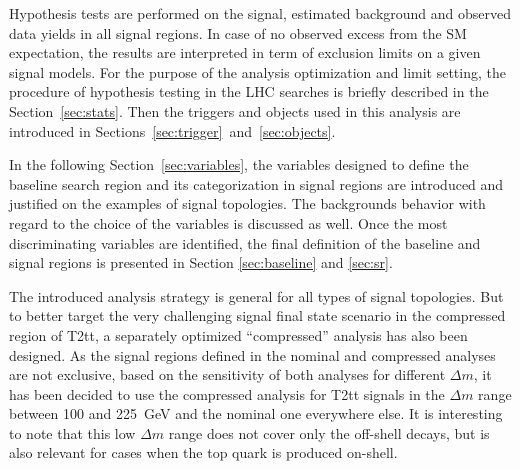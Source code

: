 Hypothesis tests are performed on the signal, estimated background and observed data yields in all signal regions. In case of no observed excess from the SM expectation, the results are interpreted in term of exclusion limits on a given signal models. For the purpose of the analysis optimization and limit setting, the procedure of hypothesis testing in the LHC searches is briefly described in the Section~\ref{sec:stats}. Then the triggers and objects used in this analysis are introduced in Sections~\ref{sec:trigger}~and~\ref{sec:objects}.
 
In the following Section~\ref{sec:variables}, the variables designed to define the baseline search region and its categorization in signal regions are introduced and justified on the examples of signal topologies. The backgrounds behavior with regard to the choice of the variables is discussed as well. Once the most discriminating variables are identified, the final definition of the baseline and signal regions is presented in Section \ref{sec:baseline} and \ref{sec:sr}. 


The introduced analysis strategy is general for all types of signal topologies. But to better target the very challenging signal final state scenario in the compressed region of T2tt, a separately optimized ``compressed'' analysis has also been designed. As the signal regions defined in the nominal and compressed analyses are not exclusive, based on the sensitivity of both analyses for different $\Delta m$,  it has been decided to use the compressed analysis for T2tt signals in the $\Delta m$ range between 100 and 225~GeV and the nominal one everywhere else. It is interesting to note that this low $\Delta m$  range does not cover only the off-shell decays, but is also relevant for cases when the top quark is produced on-shell.


